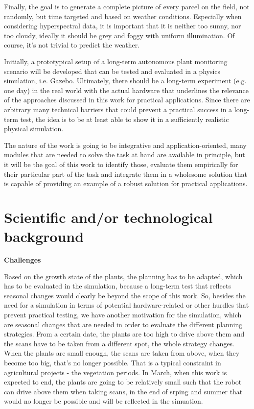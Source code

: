 \documentclass[german, master, expose, latin1]{base/thesis_KBS}
\begin{document}
Finally, the goal is to generate a complete picture of every parcel on the field, not randomly, but time targeted and based on weather conditions. 
Especially when considering hyperspectral data, it is important that it is neither too sunny, nor too cloudy, ideally it should be grey and foggy with uniform illumination.
Of course, it's not trivial to predict the weather.\newline

Initially, a prototypical setup of a long-term autonomous plant monitoring scenario will be developed that can be tested and evaluated 
in a physics simulation, i.e. Gazebo. Ultimately, there should be a long-term experiment (e.g. one day) in the real world with the actual hardware that
underlines the relevance of the approaches discussed in this work for practical applications. Since there are arbitrary many technical barriers that 
could prevent a practical success in a long-term test, the idea is to be at least able to show it in a sufficiently realistic physical simulation.\newline

The nature of the work is going to be integrative and application-oriented, many modules that are needed to solve the task at hand are available in principle, 
but it will be the goal of this work to identify those, evaluate them empirically for their particular part of the task and integrate them in a wholesome 
solution that is capable of providing an example of a robust solution for practical applications.\newline

\section{Scientific and/or technological background}

\textbf{Challenges}\newline

Based on the growth state of the plants, the planning has to be adapted, which has to be evaluated in the simulation, because a long-term test that reflects
seasonal changes would clearly be beyond the scope of this work. So, besides the need for a simulation in terms of potential hardware-related or other hurdles
that prevent practical testing, we have another motivation for the simulation, which are seasonal changes that are needed in order to evaluate the different
planning strategies. From a certain date, the plants are too high to drive above them and the scans have to be taken from a different spot, the whole strategy changes.
When the plants are small enough, the scans are taken from above, when they become too big, that's no longer possible.
That is a typical constraint in agricultural projects - the vegetation periods.
In March, when this work is expected to end, the plants are going to be relatively small such that the robot can drive above them when taking
scans, in the end of srping and summer that would no longer be possible and will be reflected in the simuation.
\end{document}
